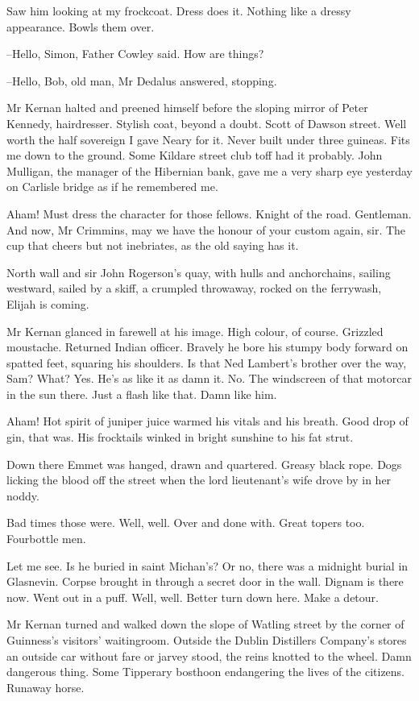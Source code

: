 Saw him looking at my frockcoat.
Dress does it.
Nothing like a dressy
appearance.
Bowls them over.

--Hello, Simon,
Father Cowley said.
How are things?

--Hello, Bob, old man,
Mr Dedalus answered,
stopping.

Mr Kernan halted and preened himself
before the sloping mirror of Peter
Kennedy, hairdresser.
Stylish coat, beyond a doubt.
Scott of Dawson
street.
Well worth the half sovereign I gave Neary for it.
Never built
under three guineas.
Fits me down to the ground.
Some Kildare street club
toff had it probably.
John Mulligan, the manager of the Hibernian bank,
gave me a very sharp eye yesterday
on Carlisle bridge as if he remembered
me.

Aham!
Must dress the character for those fellows.
Knight of the road.
Gentleman.
And now, Mr Crimmins,
may we have the honour of your custom again, sir.
The cup that cheers but not inebriates,
as the old saying has it.

North wall and sir John Rogerson's quay,
with hulls and anchorchains,
sailing westward,
sailed by a skiff,
a crumpled throwaway,
rocked on the
ferrywash,
Elijah is coming.

Mr Kernan glanced in farewell at his image.
High colour, of course.
Grizzled moustache.
Returned Indian officer.
Bravely he bore his stumpy body forward on spatted feet,
squaring his shoulders.
Is that Ned Lambert's brother over the way, Sam?
What?
Yes.
He's as like it as damn it.
No.
The windscreen of that motorcar in the sun there.
Just a flash like that.
Damn like him.%

Aham!
Hot spirit of juniper juice warmed his vitals and his breath.
Good
drop of gin, that was.
His frocktails winked in bright sunshine to his
fat strut.

Down there
Emmet was hanged, drawn and quartered.
Greasy black rope.
Dogs
licking the blood off the street
when the lord lieutenant's wife drove by
in her noddy.

Bad times those were.
Well, well.
Over and done with.
Great topers too.
Fourbottle men.

Let me see.
Is he buried in saint Michan's?
Or no, there was a midnight burial in Glasnevin.
Corpse brought in through a secret door in the wall.
Dignam is there now.
Went out in a puff.
Well, well.
Better turn down here.
Make a detour.

Mr Kernan turned and walked down the slope of Watling street
by the
corner of Guinness's visitors' waitingroom.
Outside the Dublin Distillers
Company's stores
an outside car without fare or jarvey stood,
the reins
knotted to the wheel.
Damn dangerous thing.
Some Tipperary bosthoon
endangering the lives of the citizens.
Runaway horse.

